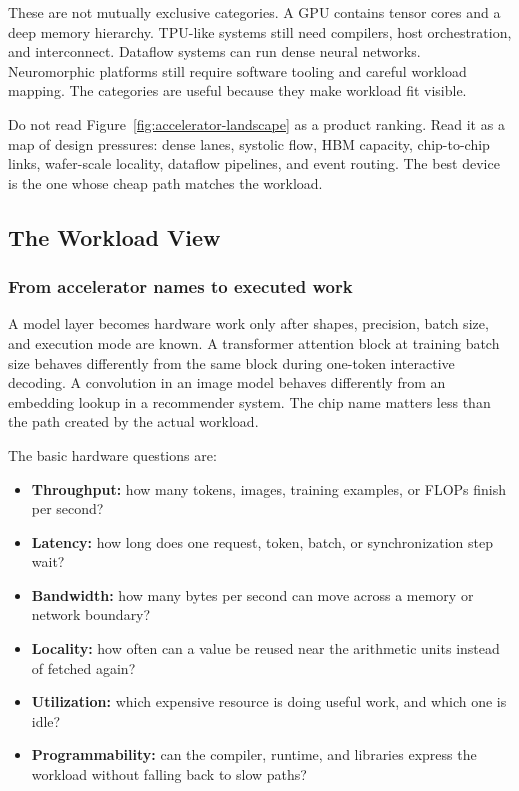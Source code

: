 These are not mutually exclusive categories. A GPU contains tensor cores and a deep memory hierarchy. TPU-like systems still need compilers, host orchestration, and interconnect. Dataflow systems can run dense neural networks. Neuromorphic platforms still require software tooling and careful workload mapping. The categories are useful because they make workload fit visible.

\begin{aside}
Do not read Figure~\ref{fig:accelerator-landscape} as a product ranking. Read it as a map of design pressures: dense lanes, systolic flow, HBM capacity, chip-to-chip links, wafer-scale locality, dataflow pipelines, and event routing. The best device is the one whose cheap path matches the workload.
\end{aside}

\subsection{The Workload View}

\subsubsection{From accelerator names to executed work}

A model layer becomes hardware work only after shapes, precision, batch size, and execution mode are known. A transformer attention block at training batch size behaves differently from the same block during one-token interactive decoding. A convolution in an image model behaves differently from an embedding lookup in a recommender system. The chip name matters less than the path created by the actual workload.

The basic hardware questions are:

\begin{itemize}[leftmargin=*]
  \item \textbf{Throughput:} how many tokens, images, training examples, or FLOPs finish per second?
  \item \textbf{Latency:} how long does one request, token, batch, or synchronization step wait?
  \item \textbf{Bandwidth:} how many bytes per second can move across a memory or network boundary?
  \item \textbf{Locality:} how often can a value be reused near the arithmetic units instead of fetched again?
  \item \textbf{Utilization:} which expensive resource is doing useful work, and which one is idle?
  \item \textbf{Programmability:} can the compiler, runtime, and libraries express the workload without falling back to slow paths?
\end{itemize}

